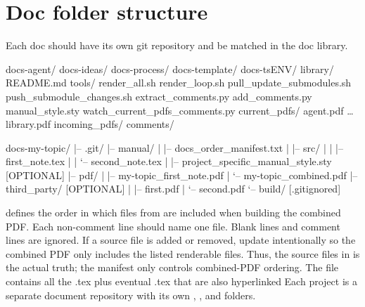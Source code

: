 \section*{Doc folder structure}\label{sec:doc-folder-structure}
Each doc should have its own git repository and be matched in the doc library.
\begin{DocCode}
  docs-agent/
  docs-ideas/
  docs-process/
  docs-template/
  docs-tsENV/
  library/
    README.md
  tools/
    render_all.sh
    render_loop.sh
    pull_update_submodules.sh
    push_submodule_changes.sh
    extract_comments.py
    add_comments.py
    manual_style.sty
    watch_current_pdfs_comments.py
  current_pdfs/
    agent.pdf
    \dots
    library.pdf
  incoming_pdfs/
  comments/
\end{DocCode}


\begin{DocCode}
docs-my-topic/
|-- .git/
|-- manual/
|   |-- docs_order_manifest.txt
|   |-- src/
|   |   |-- first_note.tex
|   |   `-- second_note.tex
|   |-- project_specific_manual_style.sty [OPTIONAL]
|-- pdf/
|   |-- my-topic_first_note.pdf
|   `-- my-topic_combined.pdf
|-- third_party/ [OPTIONAL]
|   |-- first.pdf
|   `-- second.pdf
`-- build/ [.gitignored]
\end{DocCode}
 defines the order in which files from  are included when building the combined PDF.
Each non-comment line should name one  file. 
Blank lines and comment lines are ignored.
If a source file is added or removed, update  intentionally so the combined PDF only includes the listed renderable files.
Thus, the source files in  is the actual truth; the manifest only controls combined-PDF ordering.
The file  contains all the .tex plus eventual .tex that are also hyperlinked
Each  project is a separate document repository with its own , , and  folders.
